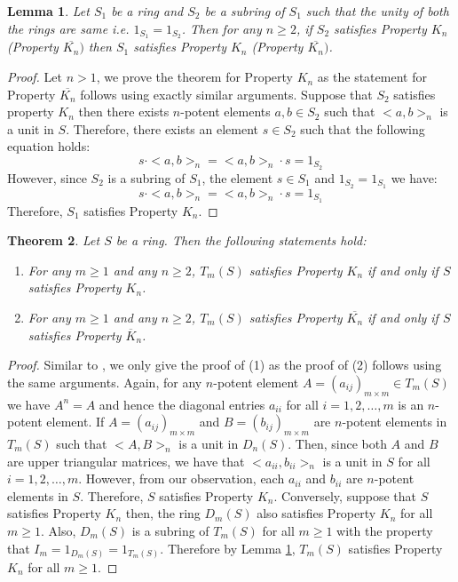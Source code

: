 \documentclass[12pt]{amsart}
\newtheorem{theorem}{Theorem}[section]
\newtheorem{lem}[theorem]{Lemma}
\theoremstyle{definition}
\numberwithin{equation}{section}
\begin{document}
\begin{lem}\label{LEM: Kn and Kn bar on subrings}
    Let $S_1$ be a ring and $S_2$ be a subring of $S_1$ such that the unity of both the rings are same i.e. $1_{S_1}=1_{S_2}$. Then for any $n \geq 2$, if $S_2$ satisfies Property $K_n$ (Property $\overline{K_n})$ then $S_1$ satisfies Property $K_n$ (Property $\overline{K_n})$.
\end{lem}
\begin{proof}
Let $n > 1$, we prove the theorem for Property $K_n$ as the statement for Property $\overline{K_n}$ follows using exactly similar arguments.
    Suppose that $S_2$ satisfies property $K_n$ then there exists $n$-potent elements $a,b \in S_2$ such that $<a,b>_n$ is a unit in $S$. Therefore, there exists an element $s \in S_2$ such that the following equation holds:
    $$s \cdot <a,b>_n=<a,b>_n\cdot s=1_{S_2}$$
    However, since $S_2$ is a subring of $S_1$, the element $s \in S_1$ and $1_{S_2}=1_{S_1}$ we have: 
    $$s \cdot <a,b>_n=<a,b>_n\cdot s=1_{S_1}$$
    Therefore, $S_1$ satisfies Property $K_n$. 
\end{proof}
\begin{theorem}\label{THM: Property Kn for T_m(S)}
    Let $S$ be a ring. Then the following statements hold:
    \begin{enumerate}
        \item For any $m \geq 1$ and any $n \geq 2$, $T_m(S)$ satisfies Property $K_n$ if and only if $S$ satisfies Property $K_n$. 
        \item For any $m \geq 1$ and any $n \geq 2$, $T_m(S)$ satisfies Property $\overline{K_n}$ if and only if $S$ satisfies Property $\overline{K}_n$.  
    \end{enumerate}
   
\end{theorem}
\begin{proof}
Similar to , we only give the proof of (1) as the proof of (2) follows using the same arguments. Again, for any $n$-potent element $A=(a_{ij})_{m \times m} \in T_m(S)$ we have $A^n=A$ and hence the diagonal entries $a_{ii}$ for all $i=1,2,\dots,m$ is an $n$-potent element.  If $A=(a_{ij})_{m \times m}$ and $B=(b_{ij})_{m \times m}$ are $n$-potent elements in $T_m(S)$  such that $<A,B>_n$ is a unit in $D_n(S)$. Then, since both $A$
 and $B$ are upper triangular matrices, we have that $<a_{ii},b_{ii}>_n$ is a unit in $S$ for all $i=1,2,\dots,m$. However, from our observation, each $a_{ii}$ and $b_{ii}$ are $n$-potent elements in $S$. Therefore, $S$ satisfies Property $K_n$. Conversely, suppose that $S$ satisfies Property $K_n$ then, the ring $D_m(S)$ also satisfies Property $K_n$ for all $m \geq 1$. Also, $D_m(S)$ is a subring of $T_m(S
)$ for all $m \geq 1$ with the property that $I_m=1_{D_m(S)}=1_{T_m(S)}$. Therefore by Lemma \ref{LEM: Kn and Kn bar on subrings}, $T_m(S)$ satisfies Property $K_n$ for all $m \geq 1$. 
\end{proof}
\end{document}
